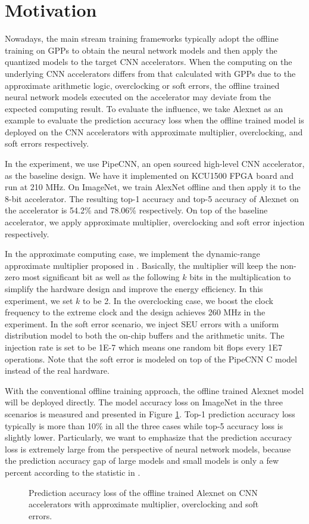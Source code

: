 \section{Motivation} \label{sec:motivation}
Nowadays, the main stream training frameworks typically adopt the offline training
on GPPs to obtain the neural network models and then apply the quantized models to the 
target CNN accelerators. When the computing on the underlying CNN accelerators differs
from that calculated with GPPs due to the approximate arithmetic logic, overclocking or 
soft errors, the offline trained neural network models executed on the accelerator 
may deviate from the expected computing result. To evaluate the influence, 
we take Alexnet as an example to evaluate the prediction 
accuracy loss when the offline trained model is deployed on the CNN 
accelerators with approximate multiplier, overclocking, and soft errors respectively. 

In the experiment, we use PipeCNN\cite{pipecnn_2}, an open sourced high-level CNN accelerator, 
as the baseline design. We have it implemented on KCU1500 FPGA board and run at 210 MHz. 
On ImageNet, we train AlexNet offline and then apply it to the 8-bit accelerator. 
The resulting top-1 accuracy and top-5 accuracy of Alexnet on the accelerator 
is 54.2\% and 78.06\% respectively. On top of the baseline accelerator, we apply 
approximate multiplier, overclocking and soft error injection respectively. 

In the approximate computing case, we implement the dynamic-range approximate 
multiplier proposed in \cite{Approximate_Multiplier_31}. Basically, the multiplier 
will keep the non-zero most significant bit as well as the following $k$ bits in the 
multiplication to simplify the hardware design and improve the energy efficiency.
In this experiment, we set $k$ to be 2. In the overclocking case, we boost the clock frequency 
to the extreme clock and the design achieves 260 MHz in the experiment. 
In the soft error scenario, we inject SEU errors with a uniform distribution model to 
both the on-chip buffers and the arithmetic units. The injection rate is set to be 
1E-7 which means one random bit flops every 1E7 operations. Note that the soft error is modeled 
on top of the PipeCNN C model instead of the real hardware.

With the conventional offline training approach, the offline trained Alexnet model 
will be deployed directly. The model accuracy loss on ImageNet in the three scenarios is 
measured and presented in Figure \ref{fig:loss}. Top-1 prediction accuracy loss 
typically is more than 10\% in all the three cases while top-5 accuracy loss is slightly 
lower. Particularly, we want to emphasize that the prediction accuracy loss is extremely large 
from the perspective of neural network models, because the prediction accuracy gap of 
large models and small models is only a few percent according to the statistic in \cite{model-accuracy}.

\begin{figure}
    \caption{Prediction accuracy loss of the offline trained Alexnet on CNN accelerators with approximate multiplier, overclocking and soft errors.}
\label{fig:loss}
\vspace{-1em}
\end{figure}


